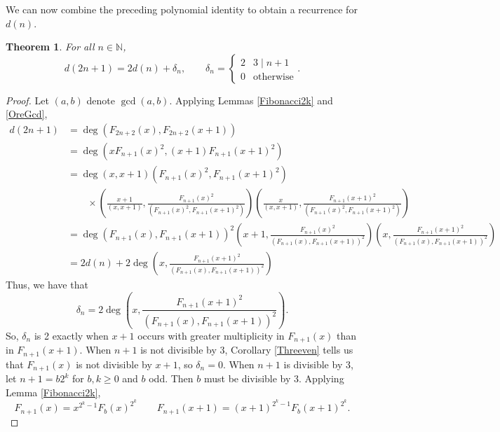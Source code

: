 \documentclass[a4paper]{article}
\newtheorem{theorem}{Theorem}[section]
\newcommand{\N}{\mathbb{N}}
\begin{document}
	We can now combine the preceding polynomial identity to obtain a recurrence for $d(n)$.
	\begin{theorem}\label{2nPlus1}
		For all $n \in \N$,
		\begin{equation*}
			d(2n+1) = 2d(n) + \delta_n, \qquad
			\delta_n = \begin{cases}
				2 & 3 \mid n+1 \\
				0 & \text{otherwise}
			\end{cases}.
		\end{equation*}
	\end{theorem}
	\begin{proof}
		Let $(a,b)$ denote $\gcd{(a,b)}$.
		Applying Lemmas \ref{Fibonacci2k} and \ref{OreGcd},
		\begin{align*}
			d(2n+1) &= \deg{\left(F_{2n+2}(x),F_{2n+2}(x+1)\right)} \\
			&= \deg{\left(xF_{n+1}(x)^2,(x+1)F_{n+1}(x+1)^2\right)} \\
			&= \deg (x,x+1)\left(F_{n+1}(x)^2,F_{n+1}(x+1)^2\right) \\
			&\qquad\times \left(\frac{x+1}{(x,x+1)},\frac{F_{n+1}(x)^2}{\left(F_{n+1}(x)^2,F_{n+1}(x+1)^2\right)}\right)\left(\frac{x}{(x,x+1)},\frac{F_{n+1}(x+1)^2}{\left(F_{n+1}(x)^2,F_{n+1}(x+1)^2\right)}\right) \\
			&= \deg{\left(F_{n+1}(x),F_{n+1}(x+1)\right)^2\left(x+1,\frac{F_{n+1}(x)^2}{\left(F_{n+1}(x),F_{n+1}(x+1)\right)^2}\right)\left(x,\frac{F_{n+1}(x+1)^2}{\left(F_{n+1}(x),F_{n+1}(x+1)\right)^2}\right)} \\
			&= 2d(n) + 2\deg{\left(x,\frac{F_{n+1}(x+1)^2}{\left(F_{n+1}(x),F_{n+1}(x+1)\right)^2}\right)}
		\end{align*}
		Thus, we have that
		\begin{equation*}
			\delta_n = 2\deg{\left(x,\frac{F_{n+1}(x+1)^2}{\left(F_{n+1}(x),F_{n+1}(x+1)\right)^2}\right)}.
		\end{equation*}
		So, $\delta_n$ is 2 exactly when $x+1$ occurs with greater multiplicity in $F_{n+1}(x)$ than in $F_{n+1}(x+1)$.
		When $n+1$ is not divisible by 3, Corollary \ref{Threeven} tells us that $F_{n+1}(x)$ is not divisible by $x+1$, so $\delta_n = 0$.
		When $n+1$ is divisible by 3, let $n+1 = b 2^{k}$ for $b,k \geq 0$ and $b$ odd.
		Then $b$ must be divisible by 3.
		Applying Lemma \ref{Fibonacci2k},
		\begin{equation*}
			F_{n+1}(x) = x^{2^{k}-1}{F_{b}(x)}^{2^k} \qquad F_{n+1}(x+1) = (x+1)^{2^{k}-1}{F_{b}(x+1)}^{2^k}.
		\end{equation*}

\end{proof}
\end{document}
